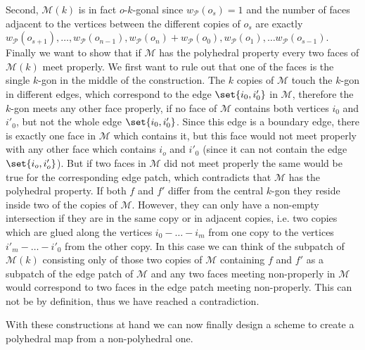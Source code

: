 \begin{construction}
\begin{cdescription}
    Second, $\mathcal{M}(k)$ is in fact $o$-$k$-gonal since $w_{\mathcal{P}}(o_s) = 1$ and the number of faces adjacent to the vertices between the different copies of $o_s$ are exactly $w_{\mathcal{P}}(o_{s + 1}), \dots, w_{\mathcal{P}}(o_{n - 1}), w_{\mathcal{P}}(o_n) + w_{\mathcal{P}}(o_0), w_{\mathcal{P}}(o_1), \dots w_{\mathcal{P}}(o_{s - 1})$. Finally we want to show that if $\mathcal{M}$ has the polyhedral property every two faces of $\mathcal{M}(k)$ meet properly. We first want to rule out that one of the faces is the single $k$-gon in the middle of the construction. The $k$ copies of $\mathcal{M}$ touch the $k$-gon in different edges, which correspond to the edge $\set{i_0, i'_0}$ in $\mathcal{M}$, therefore the $k$-gon meets any other face properly, if no face of $\mathcal{M}$ contains both vertices $i_0$ and $i'_0$, but not the whole edge $\set{i_0, i'_0}$. Since this edge is a boundary edge, there is exactly one face in $\mathcal{M}$ which contains it, but this face would not meet properly with any other face which contains $i_o$ and $i'_0$ (since it can not contain the edge $\set{i_o, i'_o}$). But if two faces in $\mathcal{M}$ did not meet properly the same would be true for the corresponding edge patch, which contradicts that $\mathcal{M}$ has the polyhedral property. If both $f$ and $f'$ differ from the central $k$-gon they reside inside two of the copies of $\mathcal{M}$. However, they can only have a non-empty intersection if they are in the same copy or in adjacent copies, i.e. two copies which are glued along the vertices $i_0 - \dots - i_m$ from one copy to the vertices $i'_m - \dots - i'_0$ from the other copy. In this case we can think of the subpatch of $\mathcal{M}(k)$ consisting only of those two copies of $\mathcal{M}$ containing $f$ and $f'$ as a subpatch of the edge patch of $\mathcal{M}$ and any two faces meeting non-properly in $\mathcal{M}$ would correspond to two faces in the edge patch meeting non-properly. This can not be by definition, thus we have reached a contradiction.
  \end{cdescription}
\end{construction}

With these constructions at hand we can now finally design a scheme to create a polyhedral map from a non-polyhedral one.


